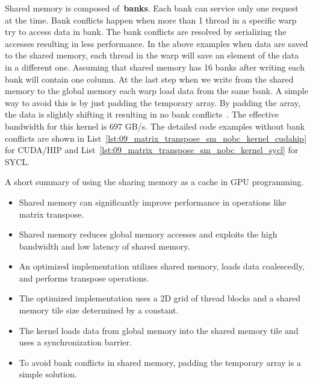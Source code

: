 \par
Shared memory is composed of~\textbf{banks}.
Each bank can service only one request at the time.
Bank conflicts happen when more than 1 thread in a specific warp try to access data in bank.
The bank conflicts are resolved by serializing the accesses resulting in less performance.
In the above examples when data are saved to the shared memory, each thread in the warp will save an element of the data in a different one.
Assuming that shared memory has 16 banks after writing each bank will contain one column.
At the last step when we write from the shared memory to the global memory each warp load data from the same bank.
A simple way to avoid this is by just padding the temporary array.
By padding the array, the data is slightly shifting it resulting in no bank conflicts~\cite{matrix_transpose_efficient, matrix_transpose_advanced}.
The effective bandwidth for this kernel is 697 GB/s.
The detailed code examples without bank conflicts are shown in List~\ref{lst:09_matrix_transpose_sm_nobc_kernel_cudahip} for CUDA/HIP and List~\ref{lst:09_matrix_transpose_sm_nobc_kernel_sycl} for SYCL.







\par
A short summary of using the sharing memory as a cache in GPU programming.
\begin{itemize}
    \item Shared memory can significantly improve performance in operations like matrix transpose.
    \item Shared memory reduces global memory accesses and exploits the high bandwidth and low latency of shared memory.
    \item An optimized implementation utilizes shared memory, loads data coalescedly, and performs transpose operations.
    \item The optimized implementation uses a 2D grid of thread blocks and a shared memory tile size determined by a constant.
    \item The kernel loads data from global memory into the shared memory tile and uses a synchronization barrier.
    \item To avoid bank conflicts in shared memory, padding the temporary array is a simple solution.
\end{itemize}



